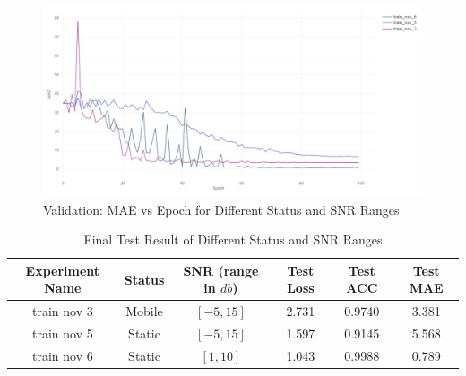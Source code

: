 \begin{figure}[H]
    \centering
    \includegraphics[width=1\linewidth]{figures/StatusSNR Valid_ MAE VS epoch.jpeg}
    \caption{Validation: MAE vs Epoch for Different Status and SNR Ranges}
\end{figure}
\begin{table}[H]
    \centering
    \begin{tabular}{|c|c|c|c|c|c|}
        \hline
         Experiment Name& Status & SNR (range in \(db\)) & Test Loss & Test ACC & Test MAE\\
         \hline
         train nov 3 & Mobile & \([-5, 15]\) & 2.731 & 0.9740 & 3.381\\
         \hline
         train nov 5 & Static & \([-5, 15]\) & 1.597 & 0.9145 & 5.568\\
         \hline
         train nov 6 & Static & \([1, 10]\) & 1.043 & 0.9988 & 0.789\\
         \hline
    \end{tabular}
    \caption{Final Test Result of Different Status and SNR Ranges}
\end{table}